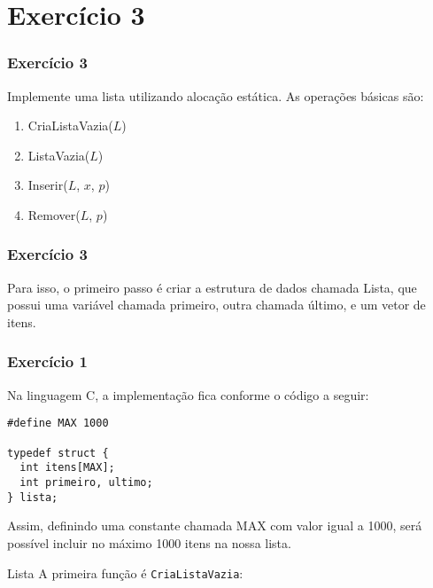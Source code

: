 \documentclass[aspectratio=169]{beamer}
\begin{document}
\section{Exercício 3}

\begin{frame}
\frametitle{Exercício 3}
Implemente uma lista utilizando alocação estática. As operações básicas são:
\begin{enumerate}
 \item CriaListaVazia($L$) 
 \item ListaVazia($L$)
 \item Inserir($L$, $x$, $p$)
 \item Remover($L$, $p$) 
\end{enumerate}
\end{frame}


\begin{frame}[fragile]
\frametitle{Exercício 3}
Para isso, o primeiro passo é criar a estrutura de dados chamada Lista, que possui uma variável chamada primeiro, outra chamada último, e um vetor de itens.
\begin{algorithm}[H]
\caption{Lista} 
\label{Nodo}
\end{algorithm} 
\end{frame}


\begin{frame}[fragile]
\frametitle{Exercício 1}
Na linguagem C, a implementação fica conforme o código a seguir:
\begin{lstlisting}[style=CStyle]
#define MAX 1000

typedef struct {
  int itens[MAX];
  int primeiro, ultimo;
} lista;
\end{lstlisting}  
Assim, definindo uma constante chamada MAX com valor igual a 1000, será possível incluir no máximo 1000 itens na nossa lista.
\end{frame}



\begin{frame}[fragile]{Lista}
A primeira função é \verb|CriaListaVazia|:
\begin{algorithm}[H]
\caption{CriaListaVazia} 
\label{CriaListaVazia}
\end{algorithm}
\end{frame}
\end{document}
